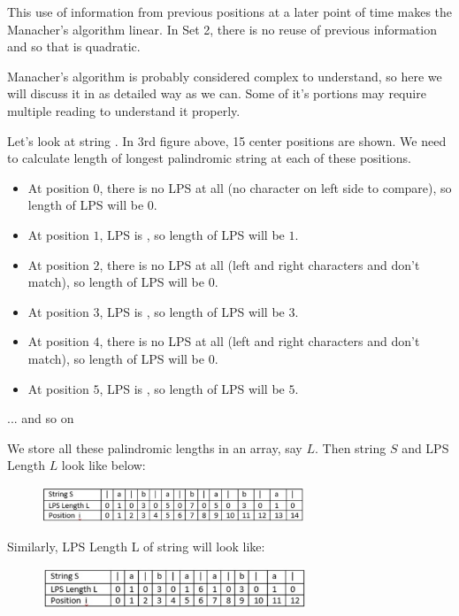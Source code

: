 This use of information from previous positions at a later point of time
makes the Manacher's algorithm linear. In Set 2, there is no reuse of
previous information and so that is quadratic.

Manacher's algorithm is probably considered complex to understand, so here
we will discuss it in as detailed way as we can. Some of it's portions may
require multiple reading to understand it properly.

Let's look at string . In 3rd figure above, 15 center positions
are shown. We need to calculate length of longest palindromic string at each
of these positions.
\begin{itemize}%
\item At position $0$, there is no LPS at all (no character on left side to
  compare), so length of LPS will be $0$.
\item At position $1$, LPS is , so length of LPS will be $1$.
\item At position $2$, there is no LPS at all (left and right characters
   and  don't match), so length of LPS will be $0$.
\item At position $3$, LPS is , so length of LPS will be $3$.
\item At position $4$, there is no LPS at all (left and right characters
   and  don't match), so length of LPS will be $0$.
\item At position $5$, LPS is , so length of LPS will be $5$.
\end{itemize}
... and so on

We store all these palindromic lengths in an array, say $L$. Then string $S$
and LPS Length $L$ look like below:

\begin{figure}
\centering
\includegraphics[width=0.7\textwidth]{Images/figGFGPalinManacher5}
\end{figure}

Similarly, LPS Length L of string  will look like:

\begin{figure}
\centering
\includegraphics[width=0.7\textwidth]{Images/figGFGPalinManacher6}
\end{figure}

